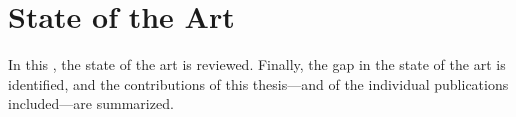 
\chapter{State of the Art}
\label{chap:state-of-art}

In this , the state of the art is reviewed.
Finally, the gap in the state of the art is identified, and the contributions of this thesis—and of the individual publications included—are summarized.
